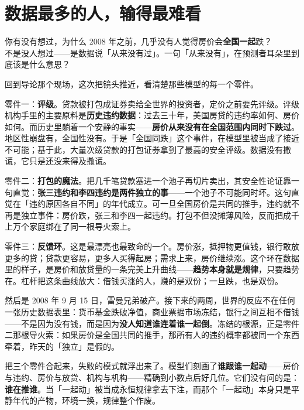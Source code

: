 \documentclass[../../main2.tex]{subfiles}
\begin{document}
	\section{数据最多的人，输得最难看}
	\label{sec:pred-crash}

	\begin{readingnote}
		你有没有想过，为什么 2008 年之前，几乎没有人觉得房价会\textbf{全国一起}跌？\\
		不是没人想过——是数据说「从来没有过」。一句「从来没有」，在预测者耳朵里到底该是什么意思？
	\end{readingnote}

	回到导论那个现场，这次把镜头推近，看清楚那些模型的每一个零件。

	零件一：\textbf{评级}。贷款被打包成证券卖给全世界的投资者，定价之前要先评级。评级机构手里的主要原料是\textbf{历史违约数据}：过去三十年，美国房贷的违约率如何、房价如何。而历史里躺着一个安静的事实——\textbf{房价从来没有在全国范围内同时下跌过}。地区性崩盘有，全国性没有。于是「全国同跌」这个事件，在模型里被当成了接近不可能；基于此，大量次级贷款的打包证券拿到了最高的安全评级。数据没有撒谎，它只是还没来得及撒谎。

	零件二：\textbf{打包的魔法}。把几千笔贷款塞进一个池子再切片卖出，其安全性论证靠一句直觉：\textbf{张三违约和李四违约是两件独立的事}——一个池子不可能同时坏。这句直觉在「违约原因各自不同」的年代成立。可一旦全国房价是共同的推手，违约就不再是独立事件：房价跌，张三和李四一起违约。打包不但没摊薄风险，反而把成千上万个家庭绑在了同一根导火索上。

	零件三：\textbf{反馈环}。这是最漂亮也最致命的一个。房价涨，抵押物更值钱，银行敢放更多的贷；贷款更容易，更多人买得起房；需求上来，房价继续涨。这个环在数据里的样子，是房价和放贷量的一条完美上升曲线——\textbf{趋势本身就是规律}，只要趋势在。杠杆把这条曲线放大：借钱买涨的人，赚的是双份；一旦跌，也是双份。

	然后是 2008 年 9 月 15 日，雷曼兄弟破产。接下来的两周，世界的反应不在任何一张历史数据表里：货币基金跌破净值，商业票据市场冻结，银行之间互相不借钱——不是因为没有钱，而是因为\textbf{没人知道谁连着谁一起倒}。冻结的根源，正是零件二那根导火索：如果房价是全国共同的推手，那所有人的违约概率都被同一个东西牵着，昨天的「独立」是假的。

	把三个零件合起来，失败的模式就浮出来了。模型们刻画了\textbf{谁跟谁一起动}——房价与违约、房价与放贷、机构与机构——精确到小数点后好几位。它们没有问的是：\textbf{谁在推谁}。当「一起动」被当成永恒规律拿去下注，而那个「一起动」本身只是平静年代的产物，环境一换，规律整个作废。
\end{document}
